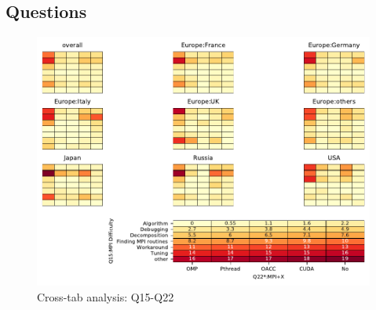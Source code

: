 
\subsection{Questions}


\begin{figure}
\begin{center}
\includegraphics[width=12cm]{../pdfs/Q15-Q22.pdf}
\caption{Cross-tab analysis: Q15-Q22}
\label{fig:Q15-Q22}
\end{center}
\end{figure}
